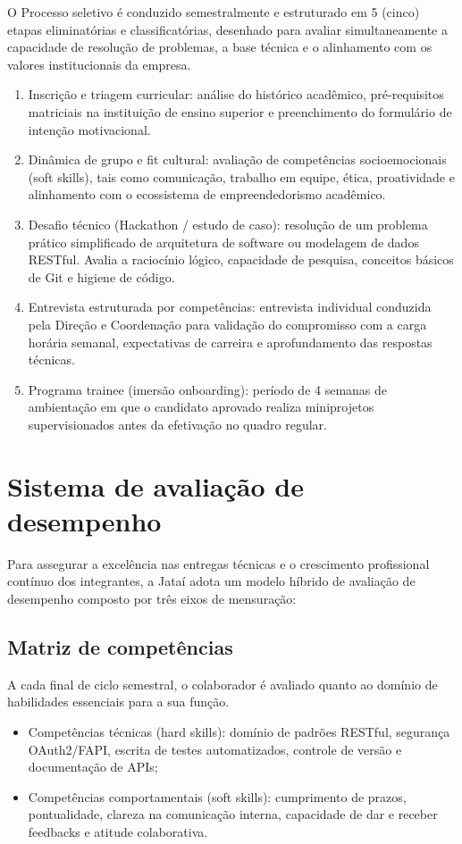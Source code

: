 \documentclass[
  12pt,
  openright,
  oneside,
  a4paper,
  brazilian
]{abntex2}
\begin{document}
O Processo seletivo é conduzido semestralmente e estruturado em 5 (cinco) etapas eliminatórias e classificatórias, desenhado para avaliar simultaneamente a capacidade de resolução de problemas, a base técnica e o alinhamento com os valores institucionais da empresa.

\begin{enumerate}[label={Etapa \arabic*:}]
    \item{Inscrição e triagem curricular:} análise do histórico acadêmico, pré-requisitos matriciais na instituição de ensino superior e preenchimento do formulário de intenção motivacional.
    \item{Dinâmica de grupo e fit cultural:} avaliação de competências socioemocionais (soft skills), tais como comunicação, trabalho em equipe, ética, proatividade e alinhamento com o ecossistema de empreendedorismo acadêmico.
    \item{Desafio técnico (Hackathon / estudo de caso):} resolução de um problema prático simplificado de arquitetura de software ou modelagem de dados RESTful. Avalia a raciocínio lógico, capacidade de pesquisa, conceitos básicos de Git e higiene de código.
    \item{Entrevista estruturada por competências:} entrevista individual conduzida pela Direção e Coordenação para validação do compromisso com a carga horária semanal, expectativas de carreira e aprofundamento das respostas técnicas.
    \item{Programa trainee (imersão onboarding):} período de 4 semanas de ambientação em que o candidato aprovado realiza miniprojetos supervisionados antes da efetivação no quadro regular.
\end{enumerate}

\section{Sistema de avaliação de desempenho}
\label{sec:avaliacao_desempenho}

Para assegurar a excelência nas entregas técnicas e o crescimento profissional contínuo dos integrantes, a Jataí adota um modelo híbrido de avaliação de desempenho composto por três eixos de mensuração:

\subsection{Matriz de competências}
A cada final de ciclo semestral, o colaborador é avaliado quanto ao domínio de habilidades essenciais para a sua função.
\begin{itemize}
    \item{Competências técnicas (hard skills):} domínio de padrões RESTful, segurança OAuth2/FAPI, escrita de testes automatizados, controle de versão e documentação de APIs;
    \item{Competências comportamentais (soft skills):} cumprimento de prazos, pontualidade, clareza na comunicação interna, capacidade de dar e receber feedbacks e atitude colaborativa.
\end{itemize}
\end{document}
